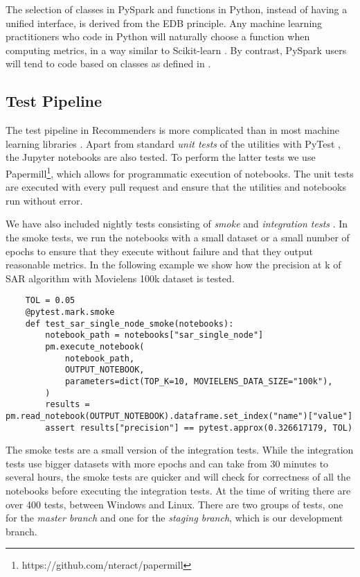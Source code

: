 The selection of classes in PySpark and functions in Python, instead of having a unified
interface, is derived from the EDB principle. Any machine learning practitioners
who code in Python will naturally choose a function when computing metrics, 
in a way similar to Scikit-learn \cite{pedregosa2011scikit}. By contrast, PySpark users 
will tend to code based on classes as defined in \cite{meng2016mllib}. 

\subsection{Test Pipeline}

The test pipeline in Recommenders is more complicated than in most machine learning
libraries \cite{abadi2016tensorflow,paszke2017automatic,pedregosa2011scikit,ke2017lightgbm}.
Apart from standard {\em unit tests} of the utilities with PyTest \cite{krekel2004pytest}, 
the Jupyter notebooks are also tested. To perform the latter tests we use Papermill\footnote{https://github.com/nteract/papermill}, 
which allows for programmatic execution of notebooks. The
unit tests are executed with every pull request and ensure that the utilities and 
notebooks run without error.

We have also included nightly tests consisting of {\em smoke} and {\em integration tests}
\cite{gonzalez-fierro2018beginners}. In the smoke tests, we run the notebooks with a 
small dataset or a small number of epochs to ensure that they execute without failure and that they 
output reasonable metrics. In the following example we show how 
the precision at k of SAR algorithm with Movielens 100k dataset is tested.

\begin{verbatim}
    TOL = 0.05
    @pytest.mark.smoke
    def test_sar_single_node_smoke(notebooks):
        notebook_path = notebooks["sar_single_node"]
        pm.execute_notebook(
            notebook_path,
            OUTPUT_NOTEBOOK,
            parameters=dict(TOP_K=10, MOVIELENS_DATA_SIZE="100k"),
        )
        results = pm.read_notebook(OUTPUT_NOTEBOOK).dataframe.set_index("name")["value"]
        assert results["precision"] == pytest.approx(0.326617179, TOL)
\end{verbatim}

The smoke tests are a small version of the integration tests. While the integration tests
use bigger datasets with more epochs and can take from 30 minutes to several hours, the smoke tests are quicker and
will check for correctness of all the notebooks before executing the integration tests.
At the time of writing there are over 400 tests, between Windows and Linux. There are two groups of tests,
one for the {\em master branch} and one for the {\em staging branch}, which is our development branch.

